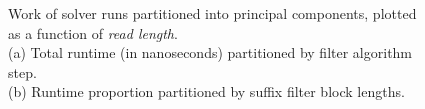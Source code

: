 \begin{figure}
\centering
{}
\caption[Work time of \aspop{} solver runs partitioned into principal components, plotted as a function of \textit{read length}]{Work of \aspop{} solver runs partitioned into principal components, plotted as a function of \textit{read length}.\\(a) Total runtime (in nanoseconds) partitioned by filter algorithm step.\\(b) Runtime proportion partitioned by suffix filter block lengths.}
\label{fig:rdlen}
\end{figure}



